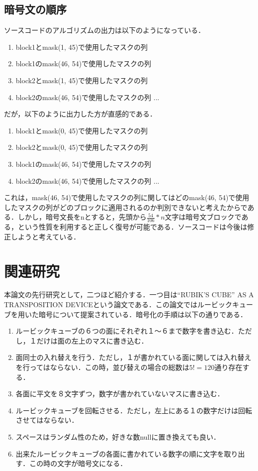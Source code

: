 \documentclass[titlepage]{jarticle}
\begin{document}
\subsection{暗号文の順序}
ソースコードのアルゴリズムの出力は以下のようになっている．\\
\begin{screen}
  \begin{enumerate}
    \item block1とmask(1, 45)で使用したマスクの列
    \item block1のmask(46, 54)で使用したマスクの列
    \item block2とmask(1, 45)で使用したマスクの列
    \item block2のmask(46, 54)で使用したマスクの列 ...
  \end{enumerate}
\end{screen}
だが，以下のように出力した方が直感的である．\\
\begin{screen}
  \begin{enumerate}
    \item block1とmask(0, 45)で使用したマスクの列
    \item block2とmask(0, 45)で使用したマスクの列
    \item block1のmask(46, 54)で使用したマスクの列
    \item block2のmask(46, 54)で使用したマスクの列 ...
  \end{enumerate}
\end{screen}
これは，mask(46, 54)で使用したマスクの列に関してはどのmask(46, 54)で使用したマスクの列がどのブロックに適用されるのか判別できないと考えたからである．しかし，暗号文長をnとすると，先頭から\(\frac{54}{106}*n\)文字は暗号文ブロックである，という性質を利用すると正しく復号が可能である．ソースコードは今後は修正しようと考えている．

\section{関連研究}
本論文の先行研究として，二つほど紹介する．一つ目は“RUBIK'S CUBE” AS A TRANSPOSITION DEVICE\cite{Mitchell}という論文である．この論文ではルービックキューブを用いた暗号について提案されている．暗号化の手順は以下の通りである．
\begin{enumerate}
  \item ルービックキューブの６つの面にそれぞれ１〜６まで数字を書き込む．ただし，１だけは面の左上のマスに書き込む．
  \item 面同士の入れ替えを行う．ただし，１が書かれている面に関しては入れ替えを行ってはならない．この時，並び替えの場合の総数は\(5!=120\)通り存在する．
  \item 各面に平文を８文字ずつ，数字が書かれていないマスに書き込む．
  \item ルービックキューブを回転させる．ただし，左上にある１の数字だけは回転させてはならない．
  \item スペースはランダム性のため，好きな数nullに置き換えても良い．
  \item 出来たルービックキューブの各面に書かれている数字の順に文字を取り出す．この時の文字が暗号文になる．
\end{enumerate}
\end{document}
